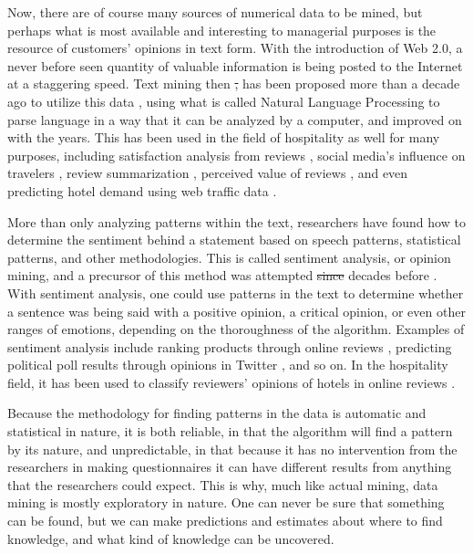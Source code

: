 \documentclass[review]{elsarticle}
\providecommand{\DIFadd}[1]{{\protect\color{blue}\uwave{#1}}} %
\providecommand{\DIFdel}[1]{{\protect\color{red}\sout{#1}}}                      %
\providecommand{\DIFaddbegin}{} %
\providecommand{\DIFaddend}{} %
\providecommand{\DIFdelbegin}{} %
\providecommand{\DIFdelend}{} %
\newcommand{\DIFscaledelfig}{0.5}
\newlength{\DIFdelgraphicswidth} %
\newlength{\DIFdelgraphicsheight} %
\newcommand{\DIFaddincludegraphics}[2][]{{\color{blue}\fbox{\DIFOincludegraphics[#1]{#2}}}} %
\newcommand{\DIFdelincludegraphics}[2][]{%
\sbox{\DIFdelgraphicsbox}{\DIFOincludegraphics[#1]{#2}}%
\settoboxwidth{\DIFdelgraphicswidth}{\DIFdelgraphicsbox} %
\settoboxtotalheight{\DIFdelgraphicsheight}{\DIFdelgraphicsbox} %
\scalebox{\DIFscaledelfig}{%
\parbox[b]{\DIFdelgraphicswidth}{\usebox{\DIFdelgraphicsbox}\\[-\baselineskip] \rule{\DIFdelgraphicswidth}{0em}}\llap{\resizebox{\DIFdelgraphicswidth}{\DIFdelgraphicsheight}{%
\setlength{\unitlength}{\DIFdelgraphicswidth}%
\begin{picture}(1,1)%
\thicklines\linethickness{2pt} %
{\color[rgb]{1,0,0}\put(0,0){\framebox(1,1){}}}%
{\color[rgb]{1,0,0}\put(0,0){\line( 1,1){1}}}%
{\color[rgb]{1,0,0}\put(0,1){\line(1,-1){1}}}%
\end{picture}%
}\hspace*{3pt}}} %
} %
\DeclareRobustCommand{\DIFaddbegin}{\DIFOaddbegin \let\includegraphics\DIFaddincludegraphics} %
\DeclareRobustCommand{\DIFaddend}{\DIFOaddend \let\includegraphics\DIFOincludegraphics} %
\DeclareRobustCommand{\DIFdelbegin}{\DIFOdelbegin \let\includegraphics\DIFdelincludegraphics} %
\DeclareRobustCommand{\DIFdelend}{\DIFOaddend \let\includegraphics\DIFOincludegraphics} %
\begin{document}
Now, there are of course many sources of numerical data to be mined, but perhaps what is most available and interesting to managerial purposes is the resource of customers' opinions in text form. With the introduction of Web 2.0, a never before seen quantity of valuable information is being posted to the Internet at a staggering speed. Text mining then \DIFdelbegin \DIFdel{, }\DIFdelend has been proposed more than a decade ago to utilize this data \cite[e.g.][]{rajman1998text,nahm2002text}, using what is called Natural Language Processing to parse language in a way that it can be analyzed by a computer, and improved on with the years. This has been used in the field of hospitality as well for many purposes, including satisfaction analysis from reviews \cite[e.g][]{berezina2016, xu2016, xiang2015, hargreaves2015, balbi2018}, social media's influence on travelers \cite[e.g.][]{xiang2010}, review summarization \cite[e.g.][]{hu2017436}, perceived value of reviews \cite[e.g][]{FANG2016498}, and even predicting hotel demand using web traffic data \cite[e.g][]{yang2014}.

More than only analyzing patterns within the text, researchers have found how to determine the sentiment behind a statement based on speech patterns, statistical patterns, and other methodologies. This is called sentiment analysis, or opinion mining, and a precursor of this method was attempted \DIFdelbegin \DIFdel{since }\DIFdelend \DIFaddbegin \DIFadd{for }\DIFaddend decades before \cite[][]{stone1966general}. With sentiment analysis, one could use patterns in the text to determine whether a sentence was being said with a positive opinion, a critical opinion, or even other ranges of emotions, depending on the thoroughness of the algorithm. Examples of sentiment analysis include ranking products through online reviews \cite[e.g][]{liu2017149, zhang2011}, predicting political poll results through opinions in Twitter \cite[][]{oconnor2010}, and so on. In the hospitality field, it has been used to classify reviewers' opinions of hotels in online reviews \cite[e.g.]{kim2017362, alsmadi2018}. 

Because the methodology for finding patterns in the data is automatic and statistical in nature, it is both reliable, in that the algorithm will find a pattern by its nature, and unpredictable, in that because it has no intervention from the researchers in making questionnaires it can have different results from anything that the researchers could expect. This is why, much like actual mining, data mining is mostly exploratory in nature. One can never be sure that something can be found, but we can make predictions and estimates about where to find knowledge, and what kind of knowledge can be uncovered. 
\end{document}
